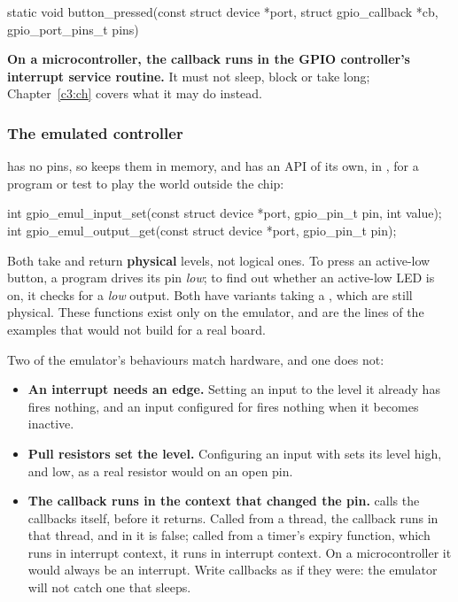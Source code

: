 \begin{ccode}
static void button_pressed(const struct device *port, struct gpio_callback *cb,
			   gpio_port_pins_t pins)
\end{ccode}

\noindent \textbf{On a microcontroller, the callback runs in the GPIO controller’s interrupt service
routine.} It must not sleep, block or take long; Chapter~\ref{c3:ch} covers what it may do instead.

\subsubsection{The emulated controller}
 has no pins, so  keeps them in memory, and has an API of its own,
in , for a program or test to play the world outside the
chip:

\begin{ccode}
int gpio_emul_input_set(const struct device *port, gpio_pin_t pin, int value);
int gpio_emul_output_get(const struct device *port, gpio_pin_t pin);
\end{ccode}

\noindent Both take and return \textbf{physical} levels, not logical ones. To press an active-low
button, a program drives its pin \emph{low}; to find out whether an active-low LED is on, it checks
for a \emph{low} output. Both have  variants taking a , which are still
physical. These functions exist only on the emulator, and are the lines of the examples that would
not build for a real board.

Two of the emulator’s behaviours match hardware, and one does not:

\begin{itemize}
  \item \textbf{An interrupt needs an edge.} Setting an input to the level it already has fires nothing, and
    an input configured for  fires nothing when it becomes inactive.
  \item \textbf{Pull resistors set the level.} Configuring an input with  sets its level
    high, and  low, as a real resistor would on an open pin.
  \item \textbf{The callback runs in the context that changed the pin.}  calls
    the callbacks itself, before it returns. Called from a thread, the callback runs in that thread, and
     in it is false; called from a timer’s expiry function, which runs in interrupt
    context, it runs in interrupt context. On a microcontroller it would always be an interrupt. Write
    callbacks as if they were: the emulator will not catch one that sleeps.
\end{itemize}

